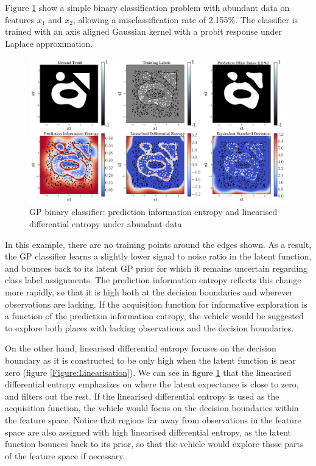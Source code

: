 \documentclass{article}
\begin{document}
		Figure \ref{Figure:Results:BinaryLinearisedEntropy} show a simple binary classification problem with abundant data on features $x_{1}$ and $x_{2}$, allowing a misclassification rate of 2.155\%. The classifier is trained with an axis aligned Gaussian kernel with a probit response under Laplace approximation. 

		\begin{figure}[t]
		\centering
			\includegraphics[width = \linewidth]{Figures/binary-eps-converted-to.png}
		\caption{GP binary classifier: prediction information entropy and linearised differential entropy under abundant data}
		\label{Figure:Results:BinaryLinearisedEntropy}
		\end{figure}
		
		In this example, there are no training points around the edges shown. As a result, the GP classifier learns a slightly lower signal to noise ratio in the latent function, and bounces back to its latent GP prior for which it remains uncertain regarding class label assignments. The prediction information entropy reflects this change more rapidly, so that it is high both at the decision boundaries and wherever observations are lacking. If the acquisition function for informative exploration is a function of the prediction information entropy, the vehicle would be suggested to explore both places with lacking observations and the decision boundaries. 
		
		On the other hand, linearised differential entropy focuses on the decision boundary as it is constructed to be only high when the latent function is near zero (figure \ref{Figure:Linearisation}). We can see in figure \ref{Figure:Results:BinaryLinearisedEntropy} that the linearised differential entropy emphasizes on where the latent expectance is close to zero, and filters out the rest. If the linearised differential entropy is used as the acquisition function, the vehicle would focus on the decision boundaries within the feature space. Notice that regions far away from observations in the feature space are also assigned with high linearised differential entropy, as the latent function bounces back to its prior, so that the vehicle would explore those parts of the feature space if necessary.
		
\end{document}
